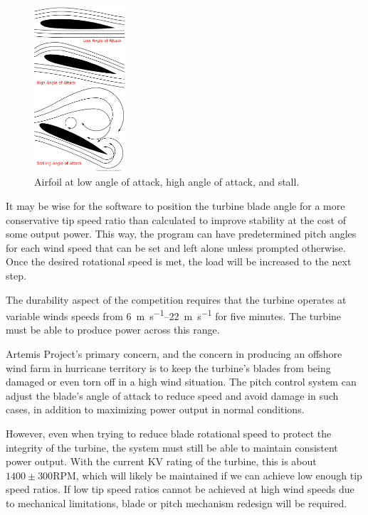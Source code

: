 \documentclass[11pt,letterpaper,conference]{IEEEtran}
\begin{document}
\begin{figure}[th]
    \centering
    \includegraphics[width=0.3\textwidth]{images/stall.jpg}
    \caption{Airfoil at low angle of attack, high angle of attack, and
        stall\cite{stall}.}
    \label{img:stall}
\end{figure}

It may be wise for the software to position the turbine blade angle for a
more conservative tip speed ratio than calculated to improve stability at the
cost of some output power. This way, the program can have predetermined pitch
angles for each wind speed that can be set and left alone unless prompted
otherwise. Once the desired rotational speed is met, the load will be
increased to the next step.

The durability aspect of the competition requires that the turbine operates at
variable winds speeds from \qtyrange{6}{22}{\m\per\s} for five minutes. The
turbine must be able to produce power across this range.

Artemis Project's primary concern, and the concern in producing an offshore
wind farm in hurricane territory is to keep the turbine's blades from being
damaged or even torn off in a high wind situation. The pitch control system can
adjust the blade's angle of attack to reduce speed and avoid damage in such
cases, in addition to maximizing power output in normal conditions.

However, even when trying to reduce blade rotational speed to protect the
integrity of the turbine, the system must still be able to maintain
consistent power output. With the current KV rating of the turbine, this is
about $1400 \pm 300$\;RPM, which will likely be maintained if we can achieve
low enough tip speed ratios. If low tip speed ratios cannot be achieved
at high wind speeds due to mechanical limitations, blade or
pitch mechanism redesign will be required.
\end{document}
